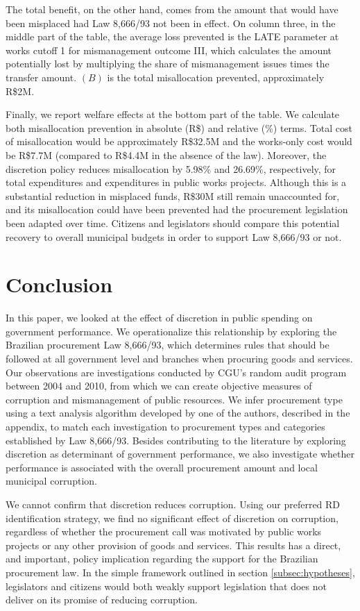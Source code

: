 \documentclass[11pt]{article}
\begin{document}
The total benefit, on the other hand, comes from the amount that would have been misplaced had Law 8,666/93 not been in effect. On column three, in the middle part of the table, the average loss prevented is the LATE parameter at works cutoff 1 for mismanagement outcome III, which calculates the amount potentially lost by multiplying the share of mismanagement issues times the transfer amount. $(B)$ is the total misallocation prevented, approximately R\$2M.

Finally, we report welfare effects at the bottom part of the table. We calculate both misallocation prevention in absolute (R\$) and relative (\%) terms. Total cost of misallocation would be approximately R\$32.5M and the works-only cost would be R\$7.7M (compared to R\$4.4M in the absence of the law). Moreover, the discretion policy reduces misallocation by 5.98\% and 26.69\%, respectively, for total expenditures and expenditures in public works projects. Although this is a substantial reduction in misplaced funds, R\$30M still remain unaccounted for, and its misallocation could have been prevented had the procurement legislation been adapted over time. Citizens and legislators should compare this potential recovery to overall municipal budgets in order to support Law 8,666/93 or not.

\section{Conclusion} \label{sec:conclusion}

In this paper, we looked at the effect of discretion in public spending on government performance. We operationalize this relationship by exploring the Brazilian procurement Law 8,666/93, which determines rules that should be followed at all government level and branches when procuring goods and services. Our observations are investigations conducted by CGU's random audit program between 2004 and 2010, from which we can create objective measures of corruption and mismanagement of public resources. We infer procurement type using a text analysis algorithm developed by one of the authors, described in the appendix, to match each investigation to procurement types and categories established by Law 8,666/93. Besides contributing to the literature by exploring discretion as determinant of government performance, we also investigate whether performance is associated with the overall procurement amount and local municipal corruption.

We cannot confirm that discretion reduces corruption. Using our preferred RD identification strategy, we find no significant effect of discretion on corruption, regardless of whether the procurement call was motivated by public works projects or any other provision of goods and services. This results has a direct, and important, policy implication regarding the support for the Brazilian procurement law. In the simple framework outlined in section \ref{subsec:hypotheses}, legislators and citizens would both weakly support legislation that does not deliver on its promise of reducing corruption.
\end{document}
